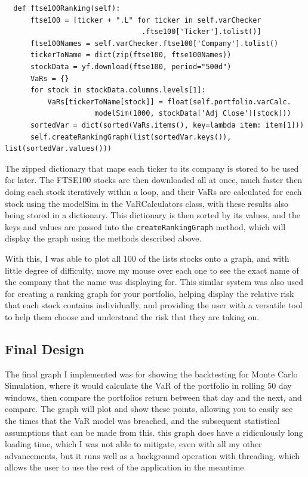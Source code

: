 \documentclass{article}
\begin{document}
\begin{verbatim}
  def ftse100Ranking(self):
      ftse100 = [ticker + ".L" for ticker in self.varChecker
                                .ftse100['Ticker'].tolist()]
      ftse100Names = self.varChecker.ftse100['Company'].tolist()
      tickerToName = dict(zip(ftse100, ftse100Names))
      stockData = yf.download(ftse100, period="500d")
      VaRs = {}
      for stock in stockData.columns.levels[1]:
          VaRs[tickerToName[stock]] = float(self.portfolio.varCalc.
                     modelSim(1000, stockData['Adj Close'][stock])) 
      sortedVar = dict(sorted(VaRs.items(), key=lambda item: item[1]))
      self.createRankingGraph(list(sortedVar.keys()), list(sortedVar.values()))
\end{verbatim}

\vspace{0.3cm}
The zipped dictionary that maps each ticker to its company is stored to be used for later. The FTSE100 stocks are then downloaded all at once, much faster then doing each stock iteratively within a loop, and their VaRs are calculated for each stock using the modelSim in the VaRCalculators class, with these results also being stored in a dictionary. This dictionary is then sorted by its values, and the keys and values are passed into the \texttt{createRankingGraph} method, which will display the graph using the methods described above.\\\vspace{0.3cm}

With this, I was able to plot all 100 of the lists stocks onto a graph, and with little degree of difficulty, move my mouse over each one to see the exact name of the company that the name was displaying for. This similar system was also used for creating a ranking graph for your portfolio, helping display the relative risk that each stock contains individually, and providing the user with a versatile tool to help them choose and understand the risk that they are taking on.\\\vspace{0.3cm}


\subsection{Final Design}
The final graph I implemented was for showing the backtesting for Monte Carlo Simulation, where it would calculate the VaR of the portfolio in rolling 50 day windows, then compare the portfolios return between that day and the next, and compare. The graph will plot and show these points, allowing you to easily see the times that the VaR model was breached, and the subsequent statistical assumptions that can be made from this. this graph does have a ridiculously long loading time, which I was not able to mitigate, even with all my other advancements, but it runs well as a background operation with threading, which allows the user to use the rest of the application in the meantime. \\\vspace{0.3cm}
\end{document}
